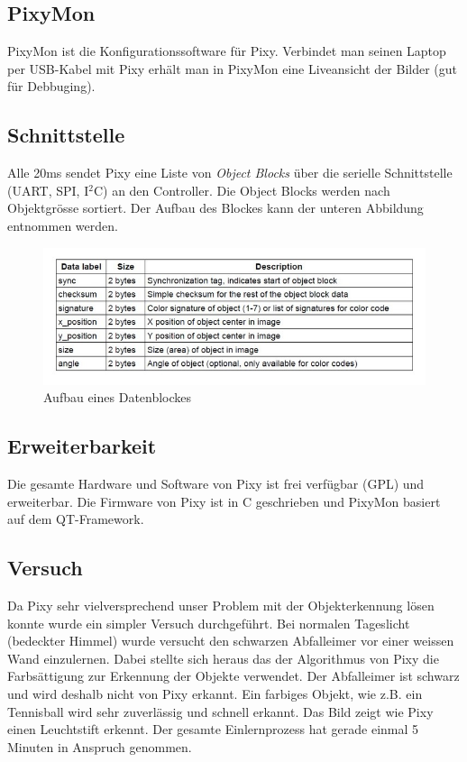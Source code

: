 \subsection{PixyMon}

PixyMon ist die Konfigurationssoftware für Pixy. Verbindet man seinen Laptop per USB-Kabel mit Pixy erhält man in PixyMon eine Liveansicht der Bilder (gut für Debbuging).

\subsection{Schnittstelle}

Alle 20ms sendet Pixy eine Liste von \textit{Object Blocks} über die serielle Schnittstelle (UART, SPI, I$^2$C) an den Controller. Die Object Blocks werden nach Objektgrösse sortiert. Der Aufbau des Blockes kann der unteren Abbildung entnommen werden.

\begin{figure}[h!]
\centering
\includegraphics[width=0.7\linewidth]{../../fig/pixy_schnittstelle}
\caption{Aufbau eines Datenblockes}
\label{fig:pixy_schnittstelle}
\end{figure}

\subsection{Erweiterbarkeit}

Die gesamte Hardware und Software von Pixy ist frei verfügbar (GPL) und erweiterbar. Die Firmware von Pixy ist in C geschrieben und PixyMon basiert auf dem QT-Framework.

\subsection{Versuch}

Da Pixy sehr vielversprechend unser Problem mit der Objekterkennung lösen konnte wurde ein simpler Versuch durchgeführt. Bei normalen Tageslicht (bedeckter Himmel) wurde versucht den schwarzen Abfalleimer vor einer weissen Wand einzulernen. Dabei stellte sich heraus das der Algorithmus von Pixy die Farbsättigung zur Erkennung der Objekte verwendet. Der Abfalleimer ist schwarz und wird deshalb nicht von Pixy erkannt. Ein farbiges Objekt, wie z.B. ein Tennisball wird sehr zuverlässig und schnell erkannt. Das Bild zeigt wie Pixy einen Leuchtstift erkennt. Der gesamte Einlernprozess hat gerade einmal 5 Minuten in Anspruch genommen.

